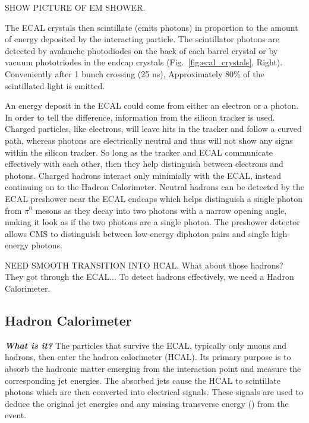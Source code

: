 SHOW PICTURE OF EM SHOWER.

The ECAL crystals then scintillate (emits photons) in proportion to the amount of energy deposited by the interacting particle. 
The scintillator photons are detected by avalanche photodiodes on the back of each barrel crystal or by vacuum phototriodes in the endcap crystals (Fig.~\ref{fig:ecal_crystals}, Right).
Conveniently after 1 bunch crossing (25 ns), Approximately 80\% of the scintillated light is emitted.

An energy deposit in the ECAL could come from either an electron or a photon.
In order to tell the difference, information from the silicon tracker is used.
Charged particles, like electrons, will leave hits in the tracker and follow a curved path, whereas photons are electrically neutral and thus will not show any signs within the silicon tracker.
So long as the tracker and ECAL communicate effectively with each other, then they help distinguish between electrons and photons.
Charged hadrons interact only minimially with the ECAL, instead continuing on to the Hadron Calorimeter.
Neutral hadrons can be detected by the ECAL preshower near the ECAL endcaps which helps distinguish a single photon from $\pi^{0}$ mesons as they decay into two photons with a narrow opening angle, making it look as if the two photons are a single photon.
The preshower detector allows CMS to distinguish between low-energy diphoton pairs and single high-energy photons.

NEED SMOOTH TRANSITION INTO HCAL. What about those hadrons? They got through the ECAL... To detect hadrons effectively, we need a Hadron Calorimeter.

\subsection{Hadron Calorimeter}
\label{subsec:hcal}

\textit{\textbf{What is it?}}
The particles that survive the ECAL, typically only muons and hadrons, then enter the hadron calorimeter (HCAL).
Its primary purpose is to absorb the hadronic matter emerging from the interaction point and measure the corresponding jet energies.
The absorbed jets cause the HCAL to scintillate photons which are then converted into electrical signals.
These signals are used to deduce the original jet energies and any missing transverse energy (\MET) from the event.

